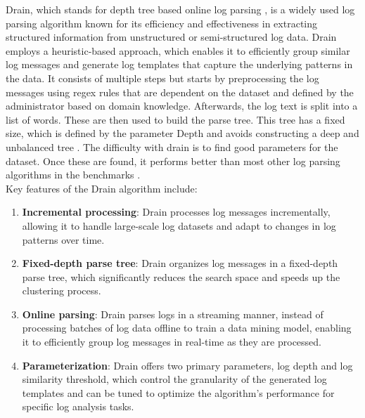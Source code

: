 Drain, which stands for depth tree based online log parsing \cite{drain}, is a widely used log parsing algorithm known for its efficiency and effectiveness in extracting structured information from unstructured or semi-structured log data. Drain employs a heuristic-based approach, which enables it to efficiently group similar log messages and generate log templates that capture the underlying patterns in the data. It consists of multiple steps but starts by
preprocessing the log messages using regex rules that are dependent on the dataset and defined by the administrator based on domain knowledge.
Afterwards, the log text is split into a list of words. These are then used to build the parse tree.
This tree has a fixed size, which is defined by the parameter Depth and avoids
constructing a deep and unbalanced tree \cite{drain}. The difficulty with drain is to find good parameters for the dataset. Once these are found, it performs better than most other log parsing algorithms in the benchmarks \cite{zhu2019tools}. \\

Key features of the Drain algorithm include:

\begin{enumerate}
    \item  \textbf{Incremental processing}: Drain processes log messages incrementally, allowing it to handle large-scale log datasets and adapt to changes in log patterns over time.
    \item  \textbf{Fixed-depth parse tree}: Drain organizes log messages in a fixed-depth parse tree, which significantly reduces the search space and speeds up the clustering process.
    \item  \textbf{Online parsing}: Drain parses logs in a streaming manner, instead of processing batches of log data offline to train a data mining model, enabling it to efficiently group log messages in real-time as they are processed.
    \item  \textbf{Parameterization}: Drain offers two primary parameters, log depth and log similarity threshold, which control the granularity of the generated log templates and can be tuned to optimize the algorithm's performance for specific log analysis tasks.
\end{enumerate}

